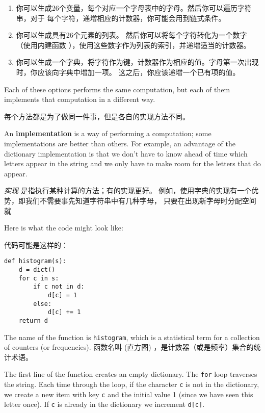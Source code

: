 \begin{enumerate}

\item 你可以生成26个变量，每个对应一个字母表中的字母。然后你可以遍历字符串，对于 每个字符，递增相应的计数器，你可能会用到链式条件。

\item 你可以生成具有26个元素的列表。 然后你可以将每个字符转化为一个数字（使用内建函数  ），使用这些数字作为列表的索引，并递增适当的计数器。

\item 你可以生成一个字典，将字符作为键，计数器作为相应的值。字母第一次出现时，你应该向字典中增加一项。 这之后，你应该递增一个已有项的值。

\end{enumerate}

Each of these options performs the same computation, but each
of them implements that computation in a different way.

每个方法都是为了做同一件事，但是各自的实现方法不同。


An {\bf implementation} is a way of performing a computation;
some implementations are better than others.  For example,
an advantage of the dictionary implementation is that we don't
have to know ahead of time which letters appear in the string
and we only have to make room for the letters that do appear.

{\em 实现} 是指执行某种计算的方法；有的实现更好。
例如，使用字典的实现有一个优势，即我们不需要事先知道字符串中有几种字母，
只要在出现新字母时分配空间就

Here is what the code might look like:

代码可能是这样的：

\begin{lstlisting}
def histogram(s):
    d = dict()
    for c in s:
        if c not in d:
            d[c] = 1
        else:
            d[c] += 1
    return d
\end{lstlisting}

%
The name of the function is {\tt histogram}, which is a statistical
term for a collection of counters (or frequencies).
函数名叫  (直方图) ，是计数器（或是频率）集合的统计术语。

  

The first line of the
function creates an empty dictionary.  The {\tt for} loop traverses
the string.  Each time through the loop, if the character {\tt c} is
not in the dictionary, we create a new item with key {\tt c} and the
initial value 1 (since we have seen this letter once).  If {\tt c} is
already in the dictionary we increment {\tt d[c]}.


